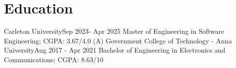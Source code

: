 \section{Education}
\resumeSubHeadingListStart
\resumeSubheading
{Carleton University}{Sep 2023- Apr 2025}
{Master of Engineering in Software Engineering; CGPA: 3.67/4.0 (A)}{}
\resumeSubheading
{Government College of Technology - Anna University}{Aug 2017 - Apr 2021}
{Bachelor of Engineering in Electronics and Communications; CGPA: 8.63/10}{}
\resumeSubHeadingListEnd
\vspace{5pt}
